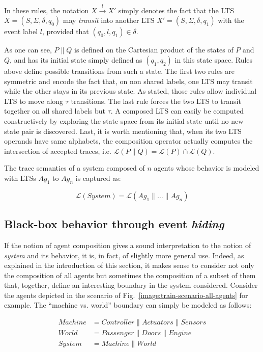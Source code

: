 In these rules, the notation $X \stackrel{l}{\longrightarrow} X'$ simply denotes the fact that the LTS $X = (S,\Sigma,\delta,q_0)$ may \emph{transit} into another LTS $X' = (S,\Sigma,\delta,q_1)$ with the event label $l$, provided that $(q_0,l,q_1) \in \delta$. 

As one can see, $P \parallel Q$ is defined on the Cartesian product of the states of $P$ and $Q$, and has its initial state simply defined as $(q_1,q_2)$ in this state space. Rules above define possible transitions from such a state. The first two rules are symmetric and encode the fact that, on non shared labels, one LTS may transit while the other stays in its previous state. As stated, those rules allow individual LTS to move along $\tau$ transitions. The last rule forces the two LTS to transit together on all shared labels but $\tau$. A composed LTS can easily be computed constructively by exploring the state space from its initial state until no new state pair is discovered. Last, it is worth mentioning that, when its two LTS operands have same alphabets, the composition operator actually computes the intersection of accepted traces, i.e. $\mathcal{L}(P \parallel Q) = \mathcal{L}(P) \cap \mathcal{L}(Q)$. 

The trace semantics of a system composed of $n$ agents whose behavior is modeled with LTSs $Ag_1$ to $Ag_n$ is captured as:

\begin{equation}
\mathcal{L}(System) = \mathcal{L}(Ag_1 \parallel \ldots \parallel Ag_n)
\label{equation:system-composition}
\end{equation}


\subsection{Black-box behavior through event \emph{hiding}}

If the notion of agent composition gives a sound interpretation to the notion of \emph{system} and its behavior, it is, in fact, of slightly more general use. Indeed, as explained in the introduction of this section, it makes sense to consider not only the composition of all agents but sometimes the composition of a subset of them that, together, define an interesting boundary in the system considered. Consider the agents depicted in the scenario of Fig.~\ref{image:train-scenario-all-agents} for example. The ``machine vs. world'' boundary can simply be modeled as follows:

\vspace{-0.8cm}
\begin{align*}
Machine &= Controller \parallel Actuators \parallel Sensors \\
World   &= Passenger \parallel Doors \parallel Engine \\
System  &= Machine \parallel World
\end{align*}
\vspace{-0.8cm}

